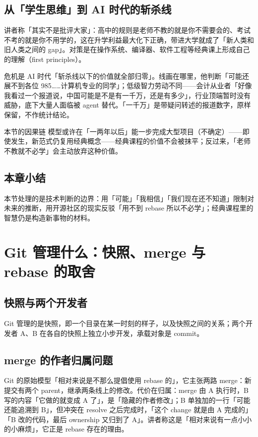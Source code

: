 \documentclass[a4paper]{article}
\begin{document}
\subsection{从「学生思维」到 AI 时代的斩杀线}

讲者称「其实不是批评大家」：高中的规则是老师不教的就是你不需要会的、考试不考的就是你不用学的，这在升学利益最大化下正确，带进大学就成了「新人类和旧人类之间的 gap」。对策是在操作系统、编译器、软件工程等经典课上形成自己的理解（first principles）。

危机是 AI 时代「斩杀线以下的价值就全部归零」。线画在哪里，他判断「可能还展不到各位 985……计算机专业的同学」；低级智力劳动不同——会计从业者「好像我看过一个报道说，中国可能是不是有一千万，还是有多少」，行业顶端暂时没有威胁，底下大量人面临被 agent 替代。「一千万」是带疑问转述的报道数字，原样保留，不作统计结论。

\begin{importantbox}{本节的因果链}
模型或许在「一两年以后」能一步完成大型项目（不确定）——即使发生，新范式仍复用经典概念——经典课程的价值不会被抹平；反过来，「老师不教就不必学」会主动放弃这种价值。
\end{importantbox}

\subsection{本章小结}

本节处理的是技术判断的边界：用「可能」「我相信」「我们现在还不知道」限制对未来的推断，用开源社区的现实反驳「用不到 rebase 所以不必学」；经典课程里的智慧仍是构造新事物的材料。

\section{Git 管理什么：快照、merge 与 rebase 的取舍}

\subsection{快照与两个开发者}

Git 管理的是快照，即一个目录在某一时刻的样子，以及快照之间的关系；两个开发者 A、B 在各自的快照上独立小步开发，承载对象是 commit。

\subsection{merge 的作者归属问题}

Git 的原始模型「相对来说是不那么提倡使用 rebase 的」，它主张两路 merge：新提交有两个 parent，继承两条线上的修改。代价在归属：merge 由 A 执行时，B 写的内容「它做的就变成 A 了」，是「隐藏的作者修改」；B 单独加的一行「可能还能追溯到 B」，但冲突在 resolve 之后完成时，「这个 change 就是由 A 完成的」「B 改的代码，最后 ownership 又归到了 A」。讲者称这是「相对来说有一点小小的小麻烦」，它正是 rebase 存在的理由。
\end{document}
